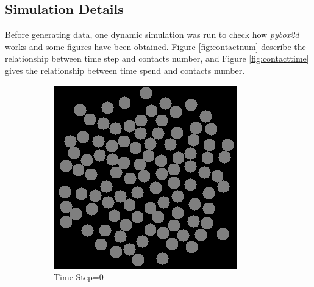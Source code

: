 \subsection{Simulation Details}
    Before generating data, one dynamic simulation was run to check how \textit{pybox2d} works and some figures have been obtained. Figure \ref{fig:contactnum} describe the relationship between time step and contacts number, and Figure \ref{fig:contacttime} gives the relationship between time spend and contacts number.
    \begin{figure}[!h]
        \centering
        \begin{subfigure}[b]{0.3\textwidth}
            \includegraphics[width=\textwidth]{Figures/sim0.png}
            \caption{Time Step=$0$}
        \end{subfigure}
        \begin{subfigure}[b]{0.3\textwidth}

\end{subfigure}
\end{figure}
